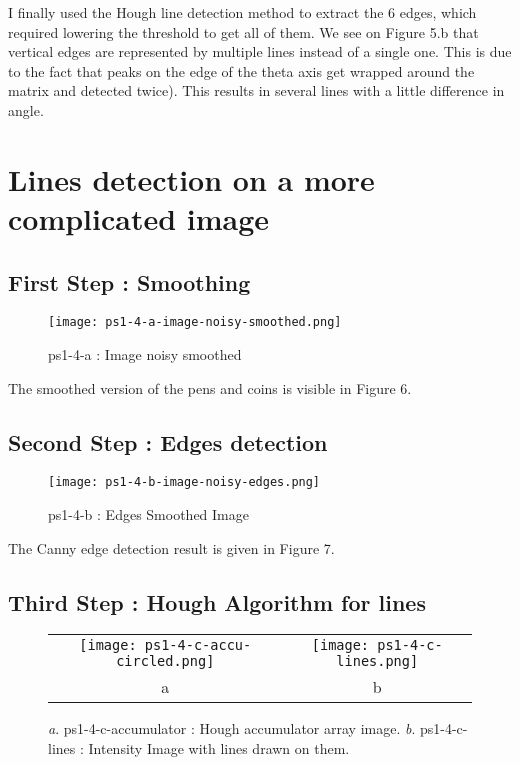 \documentclass[a4paper,11pt]{article}
\begin{document}
I finally used the Hough line detection method to extract the 6 edges, which required lowering the threshold to get all of them. We see on Figure 5.b that vertical edges are represented by multiple lines instead of a single one. This is due to the fact that peaks on the edge of the theta axis get wrapped around the matrix and detected twice). This results in several lines with a little difference in angle.

\section{Lines detection on a more complicated image}

\subsection{First Step : Smoothing}

\begin{figure}[H]
\centering
\texttt{[image: ps1-4-a-image-noisy-smoothed.png]}
 \caption{ps1-4-a : Image noisy smoothed }
\label{ps1-4-a}
\end{figure}


The smoothed version of the pens and coins is visible in Figure 6.

\subsection{Second Step : Edges detection}


\begin{figure}[H]
\centering
\texttt{[image: ps1-4-b-image-noisy-edges.png]}
 \caption{ps1-4-b : Edges Smoothed Image }
\label{ps1-4-b}
\end{figure}

The Canny edge detection result is given in Figure 7.

\subsection{Third Step : Hough Algorithm for lines}

 \begin{figure}[H]
\begin{center}
\begin{tabular}{cc}
\texttt{[image: ps1-4-c-accu-circled.png]}&
\texttt{[image: ps1-4-c-lines.png]}\\
	a&b
\end{tabular}
\end{center}
 \caption{
\textit{a}. ps1-4-c-accumulator : Hough accumulator array image.  \textit{b}. ps1-4-c-lines : Intensity Image with lines drawn on them. }
\label{ps1-4-c}
\end{figure}
\end{document}

